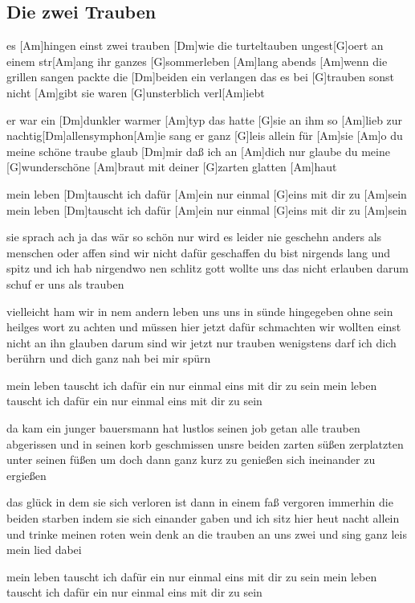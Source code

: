 \subsection*{Die zwei Trauben   }
\begin{guitar}
\begin{multicols}{2}
es [Am]hingen einst zwei trauben
[Dm]wie die turteltauben
ungest[G]oert an einem str[Am]ang
ihr ganzes [G]sommerleben [Am]lang
abends [Am]wenn die grillen sangen
packte die [Dm]beiden ein verlangen
das es bei [G]trauben sonst nicht [Am]gibt
sie waren [G]unsterblich verl[Am]iebt

er war ein [Dm]dunkler warmer [Am]typ
das hatte [G]sie an ihm so [Am]lieb
zur nachtig[Dm]allensymphon[Am]ie
sang er ganz [G]leis allein für [Am]sie
[Am]o du meine schöne traube
glaub [Dm]mir daß ich an [Am]dich nur glaube
du meine [G]wunderschöne [Am]braut
mit deiner [G]zarten glatten [Am]haut

mein leben [Dm]tauscht ich dafür [Am]ein
nur einmal [G]eins mit dir zu [Am]sein
mein leben [Dm]tauscht ich dafür [Am]ein
nur einmal [G]eins mit dir zu [Am]sein

sie sprach ach ja das wär so schön
nur wird es leider nie geschehn
anders als menschen oder affen
sind wir nicht dafür geschaffen
du bist nirgends lang und spitz
und ich hab nirgendwo nen schlitz
gott wollte uns das nicht erlauben
darum schuf er uns als trauben

vielleicht ham wir in nem andern leben
uns uns in sünde hingegeben
ohne sein heilges wort zu achten
und müssen hier jetzt dafür schmachten
wir wollten einst nicht an ihn glauben
darum sind wir jetzt nur trauben
wenigstens darf ich dich berührn
und dich ganz nah bei mir spürn


mein leben tauscht ich dafür ein
nur einmal eins mit dir zu sein
mein leben tauscht ich dafür ein
nur einmal eins mit dir zu sein


da kam ein junger bauersmann
hat lustlos seinen job getan
alle trauben abgerissen
und in seinen korb geschmissen
unsre beiden zarten süßen
zerplatzten unter seinen füßen
um doch dann ganz kurz zu genießen
sich ineinander zu ergießen


das glück in dem sie sich verloren
ist dann in einem faß vergoren
immerhin die beiden starben
indem sie sich einander gaben
und ich sitz hier heut nacht allein
und trinke meinen roten wein
denk an die trauben an uns zwei
und sing ganz leis mein lied dabei


mein leben tauscht ich dafür ein
nur einmal eins mit dir zu sein
mein leben tauscht ich dafür ein
nur einmal eins mit dir zu sein
\end{multicols}
\end{guitar}
